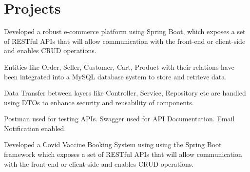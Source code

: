 \documentclass[]{deedy-resume-openfont}
\begin{document}
\begin{minipage}[t]{0.66\textwidth} 



\section{Projects}

\vspace{\topsep} %

\begin{tightemize}
\item Developed a robust e-commerce platform using Spring Boot, which exposes a set of RESTful APIs that will allow communication with the front-end or client-side and enables CRUD operations.
\item Entities like Order, Seller, Customer, Cart, Product with their relations have been integrated into a MySQL database system to store and retrieve data.
\item Data Transfer between layers like Controller, Service, Repository etc are handled using DTOs to enhance security and reusability of components. 
\item Postman used for testing APIs. Swagger used for API Documentation. Email Notification enabled.
\end{tightemize}
\sectionsep



\begin{tightemize}

\item Developed a Covid Vaccine Booking System using using the Spring Boot framework which exposes a set of RESTful APIs that will allow communication with the front-end or client-side and enables CRUD operations.


\end{tightemize}
\end{minipage}
\end{document}
